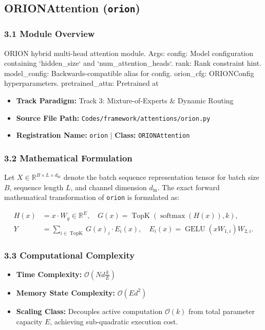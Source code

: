 \subsection{ORIONAttention (\texttt{orion})}
\label{sec:app_module_orion}

\subsubsection*{3.1 Module Overview}
ORION hybrid multi-head attention module.  Args:     config: Model configuration containing `hidden\_size` and `num\_attention\_heads`.     rank: Rank constraint hint.     model\_config: Backwards-compatible alias for config.     orion\_cfg: ORIONConfig hyperparameters.     pretrained\_attn: Pretrained at
\begin{itemize}
    \item \textbf{Track Paradigm:} Track 3: Mixture-of-Experts & Dynamic Routing
    \item \textbf{Source File Path:} \texttt{Codes/framework/attentions/orion.py}
    \item \textbf{Registration Name:} \texttt{orion} $\mid$ \textbf{Class:} \texttt{ORIONAttention}
\end{itemize}

\subsubsection*{3.2 Mathematical Formulation}
Let $X \in \mathbb{R}^{B \times L \times d_{\text{in}}}$ denote the batch sequence representation tensor for batch size $B$, sequence length $L$, and channel dimension $d_{\text{in}}$. The exact forward mathematical transformation of \texttt{orion} is formulated as:

\begin{align}
H(x) &= x \cdot W_g \in \mathbb{R}^{E}, \quad G(x) = \operatorname{TopK}\left(\operatorname{softmax}(H(x)), k\right), \\
Y &= \sum_{i \in \operatorname{TopK}} G(x)_i \cdot E_i(x), \quad E_i(x) = \operatorname{GELU}(x W_{1, i}) W_{2, i}.
\end{align}


\subsubsection*{3.3 Computational Complexity}
\begin{itemize}
    \item \textbf{Time Complexity:} $\mathcal{O}(N d \frac{k}{E})$
    \item \textbf{Memory State Complexity:} $\mathcal{O}(E d^2)$
    \item \textbf{Scaling Class:} Decouples active computation $\mathcal{O}(k)$ from total parameter capacity $E$, achieving sub-quadratic execution cost.
\end{itemize}

